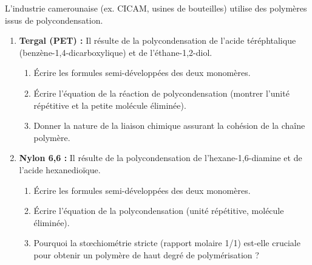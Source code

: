 \documentclass[11pt]{article}
\begin{document}
\begin{exercice}
L'industrie camerounaise (ex. CICAM, usines de bouteilles) utilise des polymères issus de polycondensation.
\begin{enumerate}
    \item \textbf{Tergal (PET) :} Il résulte de la polycondensation de l'acide téréphtalique (benzène-1,4-dicarboxylique) et de l'éthane-1,2-diol.
    \begin{enumerate}
        \item Écrire les formules semi-développées des deux monomères.
        \item Écrire l'équation de la réaction de polycondensation (montrer l'unité répétitive et la petite molécule éliminée).
        \item Donner la nature de la liaison chimique assurant la cohésion de la chaîne polymère.
    \end{enumerate}
    \item \textbf{Nylon 6,6 :} Il résulte de la polycondensation de l'hexane-1,6-diamine et de l'acide hexanedioïque.
    \begin{enumerate}
        \item Écrire les formules semi-développées des deux monomères.
        \item Écrire l'équation de la polycondensation (unité répétitive, molécule éliminée).
        \item Pourquoi la stœchiométrie stricte (rapport molaire 1/1) est-elle cruciale pour obtenir un polymère de haut degré de polymérisation ?
    \end{enumerate}
\end{enumerate}
\end{exercice}
\end{document}
